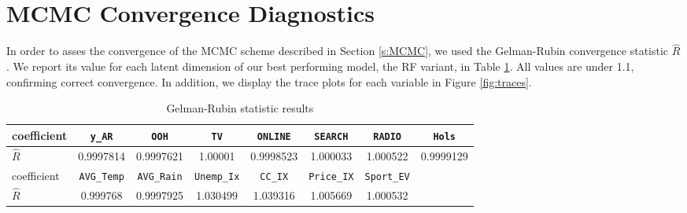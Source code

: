 
\section{MCMC Convergence Diagnostics}\label{app:GR}

In order to asses the convergence of the MCMC scheme described in Section \ref{s:MCMC}, we used the Gelman-Rubin convergence statistic $\hat{R}$. We report its value for each latent dimension of our best performing model, the RF variant, in Table \ref{tab:GR}. All values are under 1.1, confirming correct convergence. In addition, we display the trace plots for each variable in Figure \ref{fig:traces}.


\begin{table}[H]
\centering
{\footnotesize 
\begin{tabular}{|l|c|c|c|c|c|c|c|}
\hline
coefficient & \texttt{y\_AR} & \texttt{OOH} & \texttt{TV} & \texttt{ONLINE} & \texttt{SEARCH} & \texttt{RADIO} & \texttt{Hols} \\
\hline 
$\hat{R}$ & 0.9997814 & 0.9997621 & 1.00001 & 0.9998523 & 1.000033 & 1.000522 & 0.9999129 \\
\hline
coefficient & \texttt{AVG\_Temp} & \texttt{AVG\_Rain} & \texttt{Unemp\_Ix} & \texttt{CC\_IX} &  \texttt{Price\_IX}& \texttt{Sport\_EV}  & \\
\hline
$\hat{R}$ & 0.999768 & 0.9997925 & 1.030499 & 1.039316 & 1.005669 & 1.000532 & \\
\hline
\end{tabular}\caption{Gelman-Rubin statistic results}\label{tab:GR}
}
\end{table}


